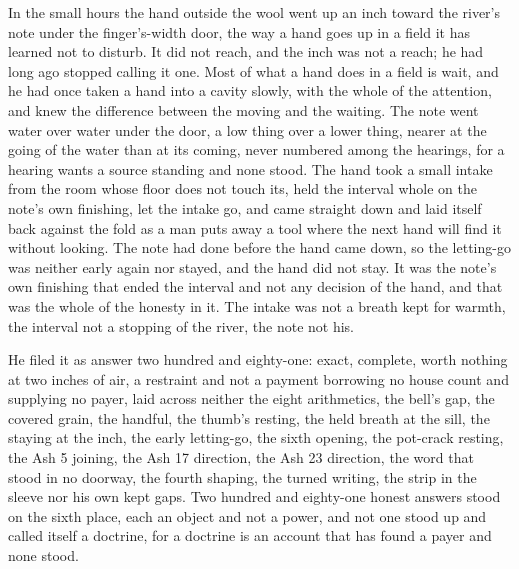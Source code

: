 \scenebreak

In the small hours the hand outside the wool went up an inch toward the river's note under the finger's-width door, the way a hand goes up in a field it has learned not to disturb. It did not reach, and the inch was not a reach; he had long ago stopped calling it one. Most of what a hand does in a field is wait, and he had once taken a hand into a cavity slowly, with the whole of the attention, and knew the difference between the moving and the waiting. The note went water over water under the door, a low thing over a lower thing, nearer at the going of the water than at its coming, never numbered among the hearings, for a hearing wants a source standing and none stood. The hand took a small intake from the room whose floor does not touch its, held the interval whole on the note's own finishing, let the intake go, and came straight down and laid itself back against the fold as a man puts away a tool where the next hand will find it without looking. The note had done before the hand came down, so the letting-go was neither early again nor stayed, and the hand did not stay. It was the note's own finishing that ended the interval and not any decision of the hand, and that was the whole of the honesty in it. The intake was not a breath kept for warmth, the interval not a stopping of the river, the note not his.

He filed it as answer two hundred and eighty-one: exact, complete, worth nothing at two inches of air, a restraint and not a payment borrowing no house count and supplying no payer, laid across neither the eight arithmetics, the bell's gap, the covered grain, the handful, the thumb's resting, the held breath at the sill, the staying at the inch, the early letting-go, the sixth opening, the pot-crack resting, the Ash 5 joining, the Ash 17 direction, the Ash 23 direction, the word that stood in no doorway, the fourth shaping, the turned writing, the strip in the sleeve nor his own kept gaps. Two hundred and eighty-one honest answers stood on the sixth place, each an object and not a power, and not one stood up and called itself a doctrine, for a doctrine is an account that has found a payer and none stood.

